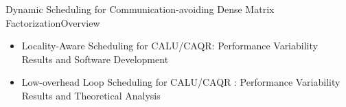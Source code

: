 \begin{frame}{Dynamic Scheduling for Communication-avoiding Dense Matrix Factorization}{Overview}
\begin{itemize}
\item Locality-Aware Scheduling for CALU/CAQR: Performance Variability Results and Software Development
\item Low-overhead Loop Scheduling for CALU/CAQR : Performance Variability Results and Theoretical Analysis
\end{itemize}
\end{frame}

